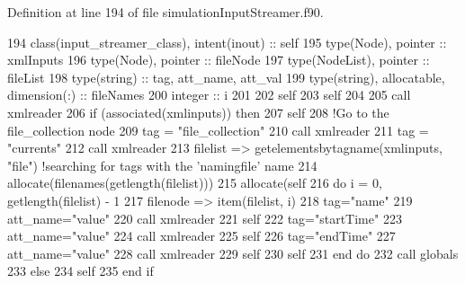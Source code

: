 Definition at line 194 of file simulation\+Input\+Streamer.\+f90.


\begin{DoxyCode}
194     \textcolor{keywordtype}{class}(input\_streamer\_class), \textcolor{keywordtype}{intent(inout)} :: self
195     \textcolor{keywordtype}{type}(Node), \textcolor{keywordtype}{pointer} :: xmlInputs
196     \textcolor{keywordtype}{type}(Node), \textcolor{keywordtype}{pointer} :: fileNode
197     \textcolor{keywordtype}{type}(NodeList), \textcolor{keywordtype}{pointer} :: fileList
198     \textcolor{keywordtype}{type}(string) :: tag, att\_name, att\_val
199     \textcolor{keywordtype}{type}(string), \textcolor{keywordtype}{allocatable}, \textcolor{keywordtype}{dimension(:)} :: fileNames
200     \textcolor{keywordtype}{integer} :: i
201 
202     self%
203     self%
204 
205     \textcolor{keyword}{call }xmlreader%
206     \textcolor{keywordflow}{if} (\textcolor{keyword}{associated}(xmlinputs)) \textcolor{keywordflow}{then}
207         self%
208         \textcolor{comment}{!Go to the file\_collection node}
209         tag = \textcolor{stringliteral}{"file\_collection"}
210         \textcolor{keyword}{call }xmlreader%
211         tag = \textcolor{stringliteral}{"currents"}
212         \textcolor{keyword}{call }xmlreader%
213         filelist => getelementsbytagname(xmlinputs, \textcolor{stringliteral}{"file"})       \textcolor{comment}{!searching for tags with the 'namingfile'
       name}
214         \textcolor{keyword}{allocate}(filenames(getlength(filelist)))
215         \textcolor{keyword}{allocate}(self%
216         \textcolor{keywordflow}{do} i = 0, getlength(filelist) - 1
217             filenode => item(filelist, i)
218             tag=\textcolor{stringliteral}{"name"}
219             att\_name=\textcolor{stringliteral}{"value"}
220             \textcolor{keyword}{call }xmlreader%
221             self%
222             tag=\textcolor{stringliteral}{"startTime"}
223             att\_name=\textcolor{stringliteral}{"value"}
224             \textcolor{keyword}{call }xmlreader%
225             self%
226             tag=\textcolor{stringliteral}{"endTime"}
227             att\_name=\textcolor{stringliteral}{"value"}
228             \textcolor{keyword}{call }xmlreader%
229             self%
230             self%
231 \textcolor{keywordflow}{        end do}
232         \textcolor{keyword}{call }globals%
233     \textcolor{keywordflow}{else}
234         self%
235 \textcolor{keywordflow}{    end if}
\end{DoxyCode}
